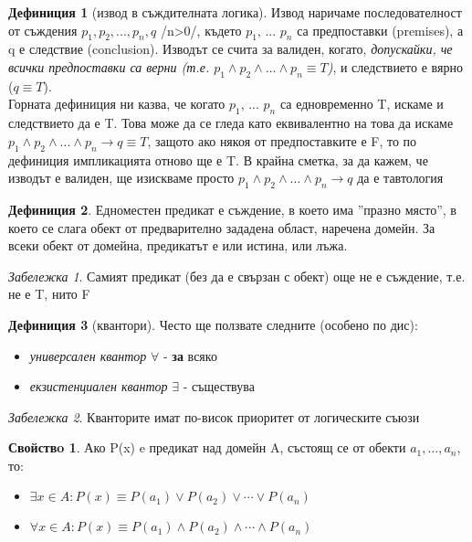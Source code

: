 \documentclass[10pt, a4paper]{article}
\theoremstyle{definition}
\newtheorem{definition}{Дефиниция}[section]
\newtheorem{prop}{Свойствo}[section]
\theoremstyle{remark}
\newtheorem*{remark}{Забележка}
\begin{document}
\begin{definition}[извод в съждителната логика]
    \label{def1.9}
    Извод наричаме последователност от съждения \(p_1, p_2, ...,p_n, q\) /n>0/, където \(p_1\), ... \(p_n\) са предпоставки (premises), а q е следствие (conclusion). Изводът се счита за валиден, когато, \emph{допускайки, че всички предпоставки са верни (т.е. \(p_1\wedge p_2\wedge ... \wedge p_n\equiv T\))}, и следствието е вярно (\(q\equiv T\)). \\Горната дефиниция ни казва, че когато \(p_1\), ... \(p_n\) са едновременно T, искаме и следствието да е T. Това може да се гледа като еквивалентно на това да искаме \(p_1\wedge p_2\wedge ... \wedge p_n\rightarrow q\equiv T\), защото ако някоя от предпоставките е F, то по дефиниция импликацията отново ще е T. В крайна сметка, за да кажем, че изводът е валиден, ще изискваме просто \(p_1\wedge p_2\wedge ... \wedge p_n\rightarrow q\) да е тавтология
\end{definition}


\begin{definition}
    Едноместен предикат е съждение, в което има ''празно място'', в което се слага обект от предварително зададена област, наречена домейн. За всеки обект от домейна, предикатът е или истина, или лъжа. 
\end{definition}
\begin{remark}
    Самият предикат (без да е свързан с обект) още не е съждение, т.е. не е T, нито F
\end{remark}

\begin{definition}[квантори] Често ще ползвате следните (особено по дис):
    \begin{itemize}
        \item \emph{универсален квантор} \(\forall\) - \textbf{за} всяко
        \item \emph{екзистенциален квантор} \(\exists\) - съществува
    \end{itemize}
\end{definition}

\begin{remark} Кванторите имат по-висок приоритет от логическите съюзи \end{remark}

\begin{prop}
\label{prop1.2}
Ако P(x) e предикат над домейн A, състоящ се от обекти \(a_1, ..., a_n\), то:
    \begin{itemize}
        \item \(\exists x\in A: P(x) \equiv P(a_1) \vee P(a_2) \vee \cdots \vee P(a_n)\)    
        \item \(\forall x\in A: P(x) \equiv P(a_1) \wedge P(a_2) \wedge \cdots \wedge P(a_n)\)    
    \end{itemize}
\end{prop}
\end{document}
